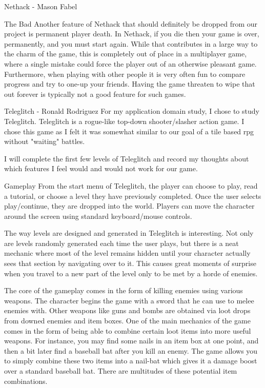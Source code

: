 \documentclass[12pt]{report}
\begin{document}
\begin{section}{Nethack - Mason Fabel}
\begin{subsection}{The Bad}
Another feature of Nethack that should definitely be dropped from our
project is permanent player death. In Nethack, if you die then your game is
over, permanently, and you must start again. While that contributes in a
large way to the charm of the game, this is completely out of place in a
multiplayer game, where a single mistake could force the player out of an
otherwise pleasant game. Furthermore, when playing with other people it
is very often fun to compare progress and try to one-up your friends.
Having the game threaten to wipe that out forever is typically not a good
feature for such games.
\end{subsection}

\end{section}

\begin{section}{Teleglitch - Ronald Rodriguez}
For my application domain study, I chose to study Teleglitch. Teleglitch 
is a rogue-like top-down shooter/slasher action game. I chose this game 
as I felt it was somewhat similar to our goal of a tile based rpg without 
"waiting" battles.

I will complete the first few levels of Teleglitch and record my thoughts 
about which features I feel would and would not work for our 
game. 

\begin{subsection}{Gameplay}
From the start menu of Teleglitch, the player can choose to play, read a 
tutorial, or choose a level they have previously completed. Once the 
user selects play/continue, they are dropped into the world. Players can move 
the character around the screen using standard keyboard/mouse controls. 

The way levels are designed and generated in Teleglitch is interesting. Not 
only are levels randomly generated each time the user plays, but there is a 
neat mechanic where most of the level remains hidden until your character 
actually sees that section by navigating over to it. This causes great 
moments of surprise when you travel to a new part of the level only to be 
met by a horde of enemies. 

The core of the gameplay comes in the form of killing enemies using various 
weapons. The character begins the game with a sword that he can use to melee 
enemies with. Other weapons like guns and bombs are obtained via loot drops 
from downed enemies and item boxes. One of the main mechanics of the game comes 
in the form of being able to combine certain loot items into more useful weapons. 
For instance, you may find some nails in an item box at one point, and then a bit 
later find a baseball bat after you kill an enemy. The game allows you to simply 
combine these two items into a nail-bat which gives it a damage boost over a 
standard baseball bat. There are multitudes of these potential item combinations. 


\end{subsection}
\end{section}
\end{document}
